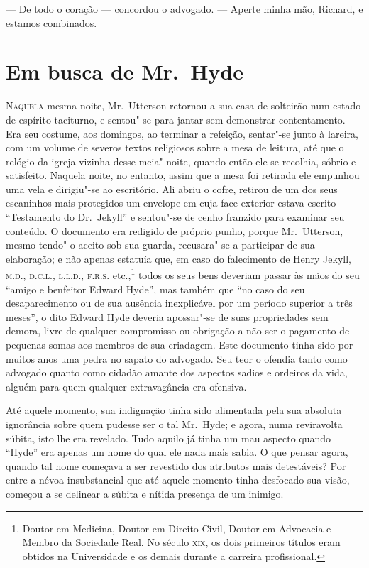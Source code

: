 --- De todo o coração --- concordou o advogado. --- Aperte minha mão,
Richard, e estamos combinados. 


\chapter[Em busca de Mr.~Hyde]{Em busca de Mr.~Hyde}

\textsc{Naquela} mesma noite, Mr.~Utterson retornou a sua casa de solteirão num
estado de espírito taciturno, e sentou"-se para jantar sem demonstrar
contentamento.  Era seu costume, aos domingos, ao terminar a refeição,
sentar"-se junto à lareira, com um volume de severos textos religiosos
sobre a mesa de leitura, até que o relógio da igreja vizinha desse
meia"-noite, quando então ele se recolhia, sóbrio e satisfeito.  Naquela
noite, no entanto, assim que a mesa foi retirada ele empunhou uma vela
e dirigiu"-se ao escritório.  Ali abriu o cofre, retirou de um dos seus
escaninhos mais protegidos um envelope em cuja face exterior estava
escrito “Testamento do Dr.~Jekyll” e sentou"-se de cenho franzido para
examinar seu conteúdo.  O documento era redigido de próprio punho,
porque Mr.~Utterson, mesmo tendo"-o aceito sob sua guarda, recusara"-se a
participar de sua elaboração; e não apenas estatuía que, em caso do
falecimento de Henry Jekyll, \textsc{m.d.}, \textsc{d.c.l.}, \textsc{l.l.d.}, \textsc{f.r.s.} etc.,\footnote{
Doutor em Medicina, Doutor em Direito Civil, Doutor em Advocacia e
Membro da Sociedade Real.  No século \textsc{xix}, os dois primeiros títulos eram
obtidos na Universidade e os demais durante a carreira profissional.}
todos os seus bens deveriam passar às mãos do seu
“amigo e benfeitor Edward Hyde”, mas também que “no caso do seu
desaparecimento ou de sua ausência inexplicável por um período superior
a três meses”, o dito Edward Hyde deveria apossar"-se de suas
propriedades sem demora, livre de qualquer compromisso ou obrigação a
não ser o pagamento de pequenas somas aos membros de sua criadagem. 
Este documento tinha sido por muitos anos uma pedra no sapato do
advogado.  Seu teor o ofendia tanto como advogado quanto como cidadão
amante dos aspectos sadios e ordeiros da vida, alguém para quem
qualquer extravagância era ofensiva.

Até aquele momento, sua indignação tinha sido alimentada pela sua
absoluta ignorância sobre quem pudesse ser o tal Mr.~Hyde; e agora,
numa reviravolta súbita, isto lhe era revelado.  Tudo aquilo já tinha
um mau aspecto quando “Hyde” era apenas um nome do qual ele nada mais
sabia.  O que pensar agora, quando tal nome começava a ser revestido
dos atributos mais detestáveis?  Por entre a névoa insubstancial que
até aquele momento tinha desfocado sua visão, começou a se delinear a
súbita e nítida presença de um inimigo. 

